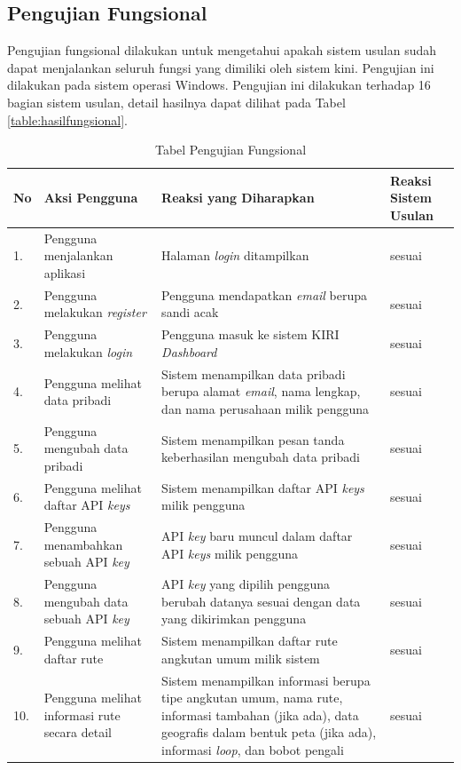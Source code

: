 \subsection{Pengujian Fungsional}
\label{sec:pengujianfungsional}
Pengujian fungsional dilakukan untuk mengetahui apakah sistem usulan sudah dapat menjalankan seluruh fungsi yang dimiliki oleh sistem kini. Pengujian ini dilakukan pada sistem operasi Windows. Pengujian ini dilakukan terhadap 16 bagian sistem usulan, detail hasilnya dapat dilihat pada Tabel \ref{table:hasilfungsional}.

\begin{table}[H]
	\centering
	\caption{Tabel Pengujian Fungsional}
		\begin{tabular}{|p{0.37cm}| p{3.5cm}| p{7cm}| p{2.5cm}|} \hline
		No & Aksi Pengguna	& Reaksi yang Diharapkan & Reaksi Sistem Usulan \\ \hline
		1. & Pengguna menjalankan aplikasi & Halaman \textit{login} ditampilkan & sesuai \\ \hline
		2. & Pengguna melakukan \textit{register} & Pengguna mendapatkan \textit{email} berupa sandi acak & sesuai \\ \hline
		3. & Pengguna melakukan \textit{login} & Pengguna masuk ke sistem KIRI \textit{Dashboard} & sesuai	\\ \hline
		4. & Pengguna melihat data pribadi & Sistem menampilkan data pribadi berupa alamat \textit{email}, nama lengkap, dan nama perusahaan milik pengguna & sesuai \\ \hline
		5. & Pengguna mengubah data pribadi & Sistem menampilkan pesan tanda keberhasilan mengubah data pribadi & sesuai\\ \hline
		6. & Pengguna melihat daftar API \textit{keys} & Sistem menampilkan daftar API \textit{keys} milik pengguna & sesuai \\ \hline
		7. & Pengguna menambahkan sebuah API \textit{key} & API \textit{key} baru muncul dalam daftar API \textit{keys} milik pengguna & sesuai \\ \hline
		8. & Pengguna mengubah data sebuah API \textit{key} & API \textit{key} yang dipilih pengguna berubah datanya sesuai dengan data yang dikirimkan pengguna & sesuai \\ \hline
		9. & Pengguna melihat daftar rute & Sistem menampilkan daftar rute angkutan umum milik sistem & sesuai \\ \hline
		10. & Pengguna melihat informasi rute secara detail & Sistem menampilkan informasi berupa tipe angkutan umum, nama rute, informasi tambahan (jika ada), data geografis dalam bentuk peta (jika ada), informasi \textit{loop}, dan bobot pengali & sesuai \\ \hline

\end{tabular}
\end{table}
